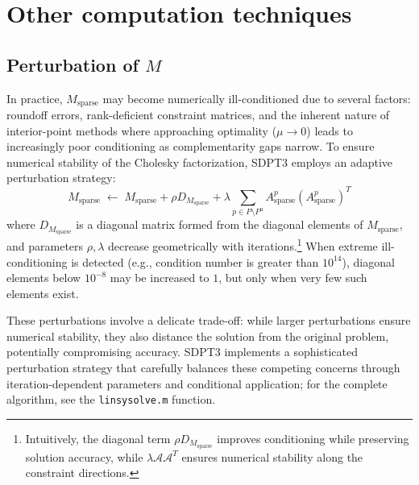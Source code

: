\section{Other computation techniques}\label{sec:other_computation}
\subsection{Perturbation of \boldmath $M$ }
In practice, $M_{\text{sparse}}$ may become numerically ill-conditioned due to several factors: 
roundoff errors, rank-deficient constraint matrices, and the inherent nature of interior-point methods where approaching optimality ($\mu \to 0$) leads to increasingly poor conditioning as complementarity gaps narrow.
To ensure numerical stability of the Cholesky factorization, SDPT3 employs an adaptive perturbation strategy:
\[
  M_{\text{sparse}} \;\leftarrow\; M_{\text{sparse}} + \rho D_{M_{\text{sparse}}} + \lambda \sum_{p\in P\setminus P^{\text{u}}}A^p_{\text{sparse}} (A^p_{\text{sparse}})^T
\]
where $D_{M_{\text{sparse}}}$ is a diagonal matrix formed from the diagonal elements of $M_{\text{sparse}}$, and parameters $\rho, \lambda$ decrease geometrically with iterations.\footnote{
  Intuitively, the diagonal term $\rho D_{M_{\text{sparse}}}$ improves conditioning while preserving solution accuracy, while $\lambda \mathcal{A}\mathcal{A}^T$ ensures numerical stability along the constraint directions.
}
When extreme ill-conditioning is detected (e.g., condition number is greater than $10^{14}$), diagonal elements below $10^{-8}$ may be increased to $1$, but only when very few such elements exist.

These perturbations involve a delicate trade-off: while larger perturbations ensure numerical stability, they also distance the solution from the original problem, potentially compromising accuracy. SDPT3 implements a sophisticated perturbation strategy that carefully balances these competing concerns through iteration-dependent parameters and conditional application; for the complete algorithm, see the \texttt{linsysolve.m} function.


